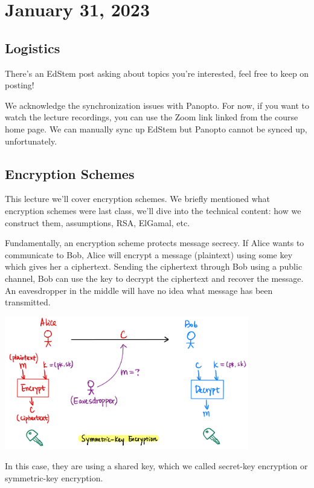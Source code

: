 \section{January 31, 2023}
\label{20230131}
\subsection{Logistics}
There's an EdStem post asking about topics you're interested, feel free to keep on posting!

We acknowledge the synchronization issues with Panopto. For now, if you want to watch the lecture recordings, you can use the Zoom link linked from the course home page. We can manually sync up EdStem but Panopto cannot be synced up, unfortunately.

\subsection{Encryption Schemes}
This lecture we'll cover encryption schemes. We briefly mentioned what encryption schemes were last class, we'll dive into the technical content: how we construct them, assumptions, RSA, ElGamal, etc.

Fundamentally, an encryption scheme protects message secrecy. If Alice wants to communicate to Bob, Alice will encrypt a message (plaintext) using some key which gives her a ciphertext. Sending the ciphertext through Bob using a public channel, Bob can use the key to decrypt the ciphertext and recover the message. An eavesdropper in the middle will have no idea what message has been transmitted.

\begin{center}
    \includegraphics[width=0.8\textwidth]{images/2023-01-31/ske-intro.png}
\end{center}

In this case, they are using a shared key, which we called secret-key encryption or symmetric-key encryption.


